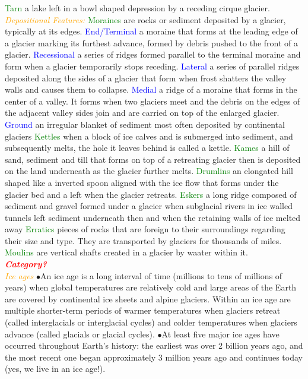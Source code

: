 \documentclass{article}
\newcommand{\ddd}{$\bullet$}
\newcommand{\red}[1]{\textcolor{red}{#1}}
\newcommand{\green}[1]{\textcolor{green}{#1}}
\newcommand{\blue}[1]{\textcolor{blue}{#1}}
\newcommand{\orange}[1]{\textcolor{orange}{#1}}
\newcommand{\mysection}[1]{\\ \textbf{\textit{\red{#1}}} \\}
\newcommand{\mysub}[1]{{\textit{\orange{#1}}}}
\newcommand{\mysubsub}[1]{{{\green{#1}}}}
\newcommand{\mysubsubsub}[1]{{{\blue{#1}}}}
\begin{document}
\begin{multicols*}{4}
 	    \mysubsub{Tarn} a lake left in a bowl shaped depression by a receding cirque glacier.
 	    \mysub{Depositional Features: }
		\mysubsub{Moraines} are rocks or sediment deposited by a glacier, typically at its edges.
		\mysubsubsub{End/Terminal} a moraine that forms at the leading edge of a glacier marking its furthest advance, formed by debris pushed to the front of a glacier.
		\mysubsubsub{Recessional} a series of ridges formed parallel to the terminal moraine and form when a glacier temporarily stops receding.
		\mysubsubsub{Lateral} a series of parallel ridges deposited along the sides of a glacier that form when frost shatters the valley walls and causes them to collapse.
		\mysubsubsub{Medial}  a ridge of a moraine that forms in the center of a valley. It forms when two glaciers meet and the debris on the edges of the adjacent valley sides join and are carried on top of the enlarged glacier.
		\mysubsubsub{Ground} an irregular blanket of sediment most often deposited by continental glaciers
		\mysubsub{Kettles} when a block of ice calves and is submerged into sediment, and subsequently melts, the hole it leaves behind is called a kettle.
		\mysubsub{Kames} a hill of sand, sediment and till that forms on top of a retreating glacier then is deposited on the land underneath as the glacier further melts.
		\mysubsub{Drumlins} an elongated hill shaped like a inverted spoon aligned with the ice flow that forms under the glacier bed and a left when the glacier retreats.
		\mysubsub{Eskers} a long ridge composed of sediment and gravel formed under a glacier when subglacial rivers in ice walled tunnels left sediment underneath then and when the retaining walls of ice melted away
		\mysubsub{Erratics} pieces of rocks that are foreign to their surroundings regarding their size and type. They are transported by glaciers for thousands of miles.
		\mysubsub{Moulins} are vertical shafts created in a glacier by waater within it.
        \mysection{Category?}
            \mysub{Ice ages}
                \ddd An ice age is a long interval of time (millions to tens of millions of years) when global temperatures are relatively cold and large areas of the Earth are covered by continental ice sheets and alpine glaciers. Within an ice age are multiple shorter-term periods of warmer temperatures when glaciers retreat (called interglacials or interglacial cycles) and colder temperatures when glaciers advance (called glacials or glacial cycles).
                \ddd At least five major ice ages have occurred throughout Earth’s history: the earliest was over 2 billion years ago, and the most recent one began approximately 3 million years ago and continues today (yes, we live in an ice age!).

\end{multicols*}
\end{document}
